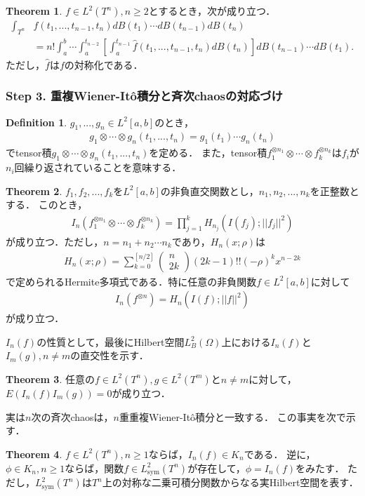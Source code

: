 \documentclass[a4paper,10pt]{jsarticle}
\theoremstyle{definition}
\newtheorem{theorem}{Theorem}
\newtheorem{definition}{Definition}
\newcommand{\eq}[1]{\begin{align}#1\end{align}}
\begin{document}
\begin{theorem}\label{thm9.6.7}%
$f\in L^2(T^n), n\ge2$とするとき，次が成り立つ．
\eq{\int_{T^n}&f(t_1,...,t_{n-1},t_n)dB(t_1)\cdots dB(t_{n-1})dB(t_n)\\
	&=n!\int_a^b\cdots\int_a^{t_{n-2}}\left[\int_a^{t_{n-1}}\hat{f}(t_1,...,t_{n-1},t_n)dB(t_n)\right]dB(t_{n-1})\cdots dB(t_1).}
ただし，$\hat{f}$は$f$の対称化である．
\end{theorem}

\subsubsection*{Step 3. 重複Wiener-It\^o積分と斉次chaosの対応づけ}
\begin{definition}%
$g_1,...,g_n\in L^2[a,b]$のとき，
\eq{g_1\otimes\cdots\otimes g_n(t_1,...,t_n)=g_1(t_1)\cdots g_n(t_n)}
でtensor積$g_1\otimes\cdots\otimes g_n(t_1,...,t_n)$を定める．
また，tensor積$f_1^{\otimes n_1}\otimes\cdots\otimes f_k^{\otimes n_k}$は$f_i$が$n_i$回繰り返されていることを意味する．
\end{definition}


\begin{theorem}\label{thm9.6.9}%
$f_1,f_2,...,f_k$を$L^2[a,b]$の非負直交関数とし，$n_1,n_2,...,n_k$を正整数とする．
このとき，
\eq{I_n\left(f_1^{\otimes n_1}\otimes\cdots\otimes f_k^{\otimes n_k}\right)
	=\prod_{j=1}^kH_{n_j}\left(I(f_j);||f_j||^2\right)}
が成り立つ．ただし，$n=n_1+n_2\cdots n_k$であり，$H_{n}(x;\rho)$は
\eq{H_n(x;\rho)=\sum_{k=0}^{[n/2]}\left(\begin{matrix}n\\2k\end{matrix}\right)(2k-1)!!(-\rho)^kx^{n-2k}}
で定められるHermite多項式である．特に任意の非負関数$f\in L^2[a,b]$に対して
\eq{I_n(f^{\otimes n})=H_n\left(I(f);||f||^2\right)}
が成り立つ．
\end{theorem}

$I_n(f)$の性質として，最後にHilbert空間$L^2_B(\Omega)$上における$I_n(f)$と$I_m(g),n\neq m$の直交性を示す．
\begin{theorem}\label{thm9.6.10}%
任意の$f\in L^2(T^n),g\in L^2(T^m)$と$n\neq m$に対して，$E\left(I_n(f)I_m(g)\right)=0$が成り立つ．
\end{theorem}

実は$n$次の斉次chaosは，$n$重重複Wiener-It\^o積分と一致する．
この事実を次で示す．
\begin{theorem}\label{thm9.7.1}%
$f\in L^2(T^n),n\ge1$ならば，$I_n(f)\in K_n$である．
逆に，$\phi\in K_n,n\ge1$ならば，関数$f\in L^2_\mathrm{sym}(T^n)$が存在して，$\phi=I_n(f)$をみたす．
ただし，$L^2_\mathrm{sym}(T^n)$は$T^n$上の対称な二乗可積分関数からなる実Hilbert空間を表す．
\end{theorem}
\end{document}
